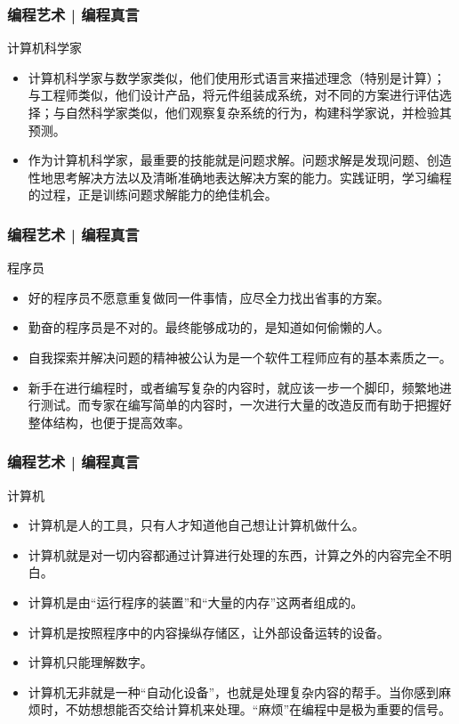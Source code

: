 \begin{frame}
  \frametitle{编程艺术 | 编程真言}
  \begin{block}{计算机科学家}
    \begin{itemize}
      \item 计算机科学家与数学家类似，他们使用形式语言来描述理念（特别是计算）；与工程师类似，他们设计产品，将元件组装成系统，对不同的方案进行评估选择；与自然科学家类似，他们观察复杂系统的行为，构建科学家说，并检验其预测。
      \item 作为计算机科学家，最重要的技能就是\alert{问题求解}。问题求解是发现问题、创造性地思考解决方法以及清晰准确地表达解决方案的能力。实践证明，学习编程的过程，正是训练问题求解能力的绝佳机会。
    \end{itemize}
  \end{block}
\end{frame}

\begin{frame}
  \frametitle{编程艺术 | 编程真言}
  \begin{block}{程序员}
    \begin{itemize}
      \item 好的程序员不愿意重复做同一件事情，应尽全力找出省事的方案。
      \item 勤奋的程序员是不对的。最终能够成功的，是知道如何\alert{偷懒}的人。
      \item \alert{自我探索并解决问题的精神}被公认为是一个软件工程师应有的基本素质之一。 
      \item \alert{新手}在进行编程时，或者编写复杂的内容时，就应该一步一个脚印，频繁地进行测试。而\alert{专家}在编写简单的内容时，一次进行大量的改造反而有助于把握好整体结构，也便于提高效率。
    \end{itemize}
  \end{block}
\end{frame}

\begin{frame}
  \frametitle{编程艺术 | 编程真言}
  \begin{block}{计算机}
    \begin{itemize}
      \item 计算机是人的工具，只有人才知道他自己想让计算机做什么。
      \item 计算机就是对一切内容都通过计算进行处理的东西，计算之外的内容完全不明白。
      \item 计算机是由“运行程序的装置”和“大量的内存”这两者组成的。
      \item 计算机是按照程序中的内容操纵存储区，让外部设备运转的设备。
      \item 计算机只能理解数字。
      \item 计算机无非就是一种“\alert{自动化设备}”，也就是处理复杂内容的帮手。当你感到麻烦时，不妨想想能否交给计算机来处理。“麻烦”在编程中是极为重要的信号。
    \end{itemize}
  \end{block}
\end{frame}

